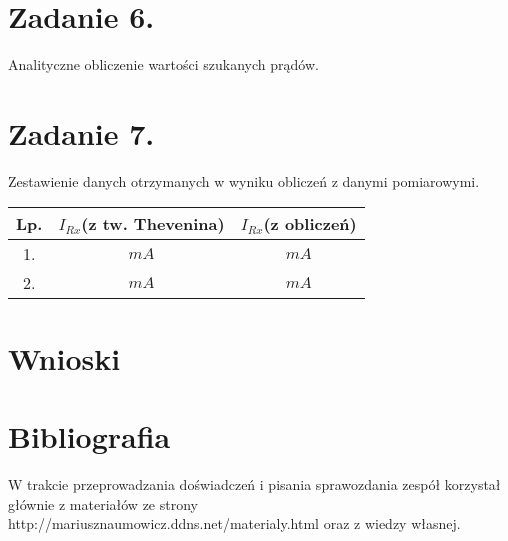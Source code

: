 \documentclass[polish,a4paper]{article}
\begin{document}
\section{Zadanie 6.}
Analityczne obliczenie wartości szukanych prądów.


\section{Zadanie 7.}
Zestawienie danych otrzymanych w wyniku obliczeń z danymi pomiarowymi.

\begin{center}
\begin{tabular}{|c|c|c|}
\hline
\textbf{Lp.} & \textbf{$I_{Rx}$(z tw. Thevenina)} & \textbf{$I_{Rx}$(z obliczeń)}\\
\hline
1. & $mA$ & $mA$\\
\hline %
2. & $mA$ & $mA$\\
\hline
\end{tabular}
\end{center}

\section{Wnioski}


\section*{Bibliografia}
W trakcie przeprowadzania doświadczeń i pisania sprawozdania zespół korzystał głównie z materiałów ze strony http://mariusznaumowicz.ddns.net/materialy.html oraz z wiedzy własnej.



\end{document}
